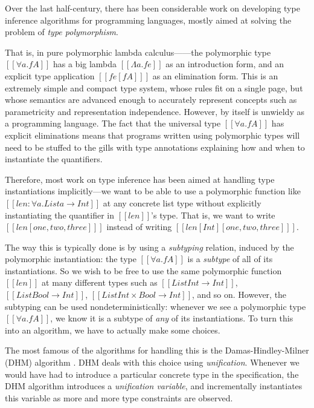 Over the last half-century, there has been considerable work on developing type
inference algorithms for programming languages,  mostly aimed at solving the
problem of \emph{type polymorphism}.

That is, in pure polymorphic lambda
calculus---\systemf\cite{girard-system-f,jcr-system-f}---the polymorphic type
$[[∀a.fA]]$ has a big lambda $[[Λa.fe]]$ as an introduction form, and an
explicit type application $[[ fe[fA] ]]$ as an elimination form. This is an
extremely simple and compact type system, whose rules fit on a single page, but
whose semantics are advanced enough to accurately represent concepts such as
parametricity and representation independence. However, \systemf by itself is
unwieldy as a programming language. The fact that the universal type $[[∀a.fA]]$
has explicit eliminations means that programs written using polymorphic types
will need to be stuffed to the gills with type annotations explaining how and
when to instantiate the quantifiers.

Therefore, most work on type inference has been aimed at handling type
instantiations implicitly---we want to be able to use a polymorphic function
like $[[len : ∀a.List a → Int]]$ at any concrete list type without explicitly
instantiating the quantifier in $[[len]]$'s type. That is, we want to write
$[[ len [one,two,three] ]]$ instead of writing
$[[ len [Int] [one,two,three] ]]$.

The way this is typically done is by using a \emph{subtyping} relation, induced
by the polymorphic instantiation: the type $[[∀a.fA]]$ is a \emph{subtype} of
all of its instantiations. So we wish to be free to use the same polymorphic
function $[[len]]$ at many different types such as $[[List Int → Int]]$, $[[List
Bool → Int]]$, $[[List Int × Bool → Int]]$, and so on. However, the subtyping
can be used nondeterministically: whenever we see a polymorphic type
$[[∀a.fA]]$, we know it is a subtype of \emph{any} of its instantiations. To
turn this into an algorithm, we have to actually make some choices. 

The most famous of the algorithms for handling this is the Damas-Hindley-Milner
(DHM) algorithm \cite{hindley69:principal,milner78:theory,damas82:principal}.
DHM deals with this choice using \emph{unification}. Whenever we would have had
to introduce a particular concrete type in the specification, the DHM algorithm
introduces a \emph{unification variable}, and incrementally instantiates this variable
as more and more type constraints are observed.

